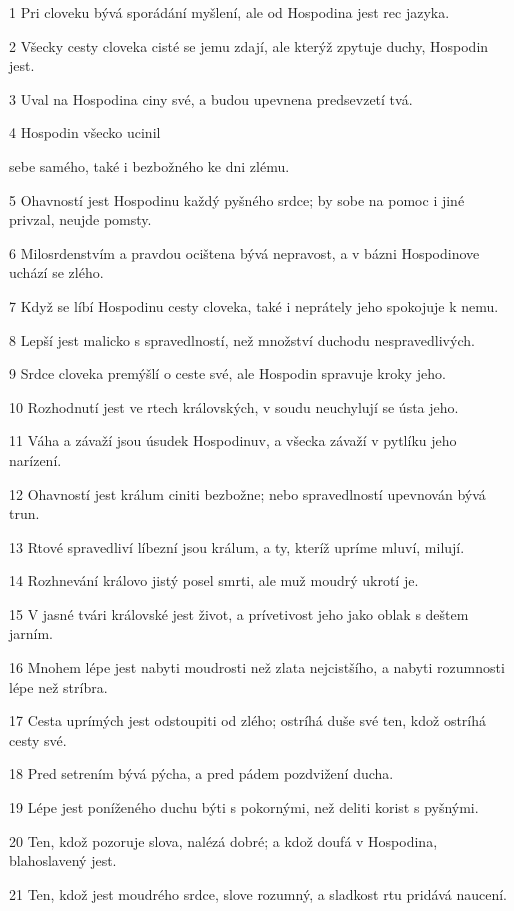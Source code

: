 \par 1 Pri cloveku bývá sporádání myšlení, ale od Hospodina jest rec jazyka.
\par 2 Všecky cesty cloveka cisté se jemu zdají, ale kterýž zpytuje duchy, Hospodin jest.
\par 3 Uval na Hospodina ciny své, a budou upevnena predsevzetí tvá.
\par 4 Hospodin všecko ucinil \par sebe samého, také i bezbožného ke dni zlému.
\par 5 Ohavností jest Hospodinu každý pyšného srdce; by sobe na pomoc i jiné privzal, neujde pomsty.
\par 6 Milosrdenstvím a pravdou ocištena bývá nepravost, a v bázni Hospodinove uchází se zlého.
\par 7 Když se líbí Hospodinu cesty cloveka, také i neprátely jeho spokojuje k nemu.
\par 8 Lepší jest malicko s spravedlností, než množství duchodu nespravedlivých.
\par 9 Srdce cloveka premýšlí o ceste své, ale Hospodin spravuje kroky jeho.
\par 10 Rozhodnutí jest ve rtech královských, v soudu neuchylují se ústa jeho.
\par 11 Váha a závaží jsou úsudek Hospodinuv, a všecka závaží v pytlíku jeho narízení.
\par 12 Ohavností jest králum ciniti bezbožne; nebo spravedlností upevnován bývá trun.
\par 13 Rtové spravedliví líbezní jsou králum, a ty, kteríž upríme mluví, milují.
\par 14 Rozhnevání královo jistý posel smrti, ale muž moudrý ukrotí je.
\par 15 V jasné tvári královské jest život, a prívetivost jeho jako oblak s deštem jarním.
\par 16 Mnohem lépe jest nabyti moudrosti než zlata nejcistšího, a nabyti rozumnosti lépe než stríbra.
\par 17 Cesta uprímých jest odstoupiti od zlého; ostríhá duše své ten, kdož ostríhá cesty své.
\par 18 Pred setrením bývá pýcha, a pred pádem pozdvižení ducha.
\par 19 Lépe jest poníženého duchu býti s pokornými, než deliti korist s pyšnými.
\par 20 Ten, kdož pozoruje slova, nalézá dobré; a kdož doufá v Hospodina, blahoslavený jest.
\par 21 Ten, kdož jest moudrého srdce, slove rozumný, a sladkost rtu pridává naucení.
